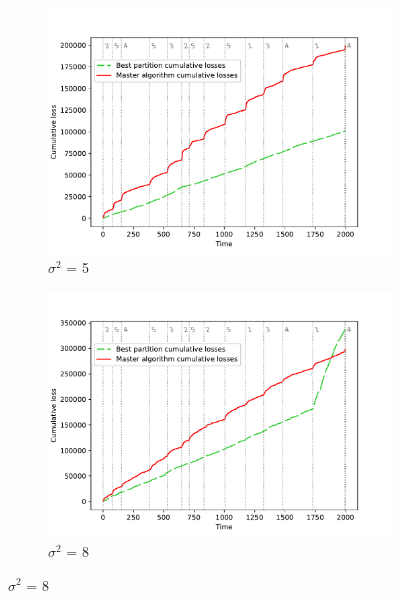 \documentclass[12pt, twoside]{article}
\begin{document}
\begin{figure}[H]
\begin{subfigure}{0.49\textwidth}
  \includegraphics[width=\linewidth]{dec_noise_5}
  \caption{$\sigma^2$ = 5}
  \label{fig:n_5}
\end{subfigure}
\begin{subfigure}{0.49\textwidth}
  \includegraphics[width=\linewidth]{dec_noise_8}
  \caption{$\sigma^2$ = 8}
  \label{fig:n_8}
\end{subfigure}\hfil 


\end{figure}
\end{document}
